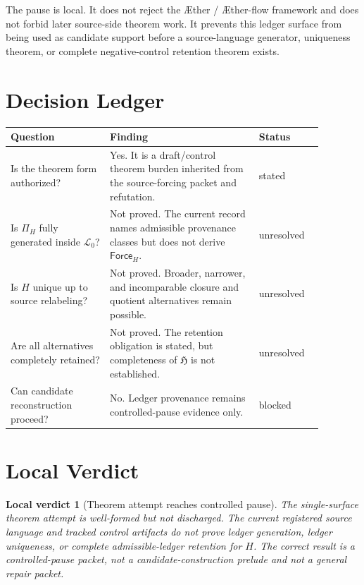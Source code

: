 \documentclass[11pt]{article}
\newcommand{\Aether}{\AE{}ther}
\newcommand{\Aflow}{\AE{}ther-flow}
\newcommand{\TheoryProgram}{\Aether{} / \Aflow{} framework}
\newcommand{\Lang}{\mathcal{L}_{0}}
\newcommand{\LedgerFam}{\mathfrak{H}}
\newcommand{\ForceH}{\mathsf{Force}_{H}}
\newtheorem{localverdict}{Local verdict}
\begin{document}
The pause is local. It does not reject the \TheoryProgram{} and does not
forbid later source-side theorem work. It prevents this ledger surface from
being used as candidate support before a source-language generator,
uniqueness theorem, or complete negative-control retention theorem exists.

\section{Decision Ledger}

\begin{center}
\begin{tabular}{p{0.28\linewidth}p{0.42\linewidth}p{0.18\linewidth}}
\textbf{Question} & \textbf{Finding} & \textbf{Status} \\
\hline
Is the theorem form authorized? & Yes. It is a draft/control theorem burden inherited from the source-forcing packet and refutation. & stated \\
Is \(\Pi_H\) fully generated inside \(\Lang\)? & Not proved. The current record names admissible provenance classes but does not derive \(\ForceH\). & unresolved \\
Is \(H\) unique up to source relabeling? & Not proved. Broader, narrower, and incomparable closure and quotient alternatives remain possible. & unresolved \\
Are all alternatives completely retained? & Not proved. The retention obligation is stated, but completeness of \(\LedgerFam\) is not established. & unresolved \\
Can candidate reconstruction proceed? & No. Ledger provenance remains controlled-pause evidence only. & blocked \\
\end{tabular}
\end{center}

\section{Local Verdict}

\begin{localverdict}[Theorem attempt reaches controlled pause]
The single-surface theorem attempt is well-formed but not discharged. The
current registered source language and tracked control artifacts do not
prove ledger generation, ledger uniqueness, or complete admissible-ledger
retention for \(H\). The correct result is a controlled-pause packet, not a
candidate-construction prelude and not a general repair packet.
\end{localverdict}
\end{document}
